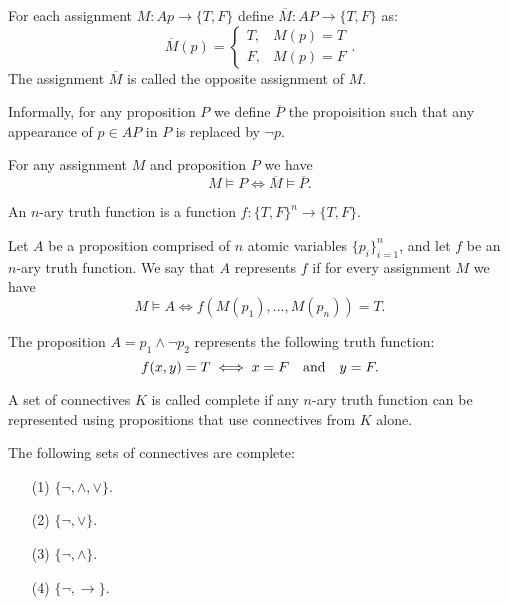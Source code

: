 \documentclass[11pt,a4paper]{article}
\renewcommand{\implies}{\rightarrow}
\begin{document}
  \begin{definition}
    For each assignment $M \colon Ap \to \{T, F\}$ 
    define $\overline M \colon AP \to \{T, F\}$ as:
    \[
      \overline M(p) =
      \begin{cases}
        T, &M(p) = T \\
        F, &M(p) = F
      \end{cases}.
    \]
    The assignment $\overline M$ is called the opposite assignment
    of $M$.
  \end{definition}
  
  Informally, for any proposition $P$ we define $\overline P$ the
  propoisition such that any appearance of $p \in AP$ in $P$ is
  replaced by $\neg p$.

  \begin{proposition}
    For any assignment $M$ and proposition $P$ we have
    \[
      M \models P \iff \overline M \models \overline P.
    \]
  \end{proposition}

  \begin{definition}
    An $n$-ary truth function is a function
    $f \colon \{T, F\}^n \to \{T, F\}$.
  \end{definition}

  \begin{definition}
    Let $A$ be a proposition comprised of $n$ atomic variables
    $\{p_i\}_{i=1}^{n}$, and let $f$ be an $n$-ary truth function.
    We say that $A$ represents $f$ if for every assignment
    $M$ we have
    \[
      M \models A \iff
      f(M(p_1),\dots,M(p_n)) = T.
    \]
  \end{definition}

  \begin{example}
    The proposition $A = p_1 \land \neg p_2$ represents the following
    truth function:
    \[
      f(x,y) = T \iff x = F \quad \text{and} \quad y = F.
    \]
  \end{example}

  \begin{definition}
    A set of connectives $K$ is called complete if any $n$-ary truth
    function can be represented using propositions that use connectives from 
    $K$ alone.
  \end{definition}

  \begin{proposition}
    The following sets of connectives are complete:
    \begin{enumerate}
      \item[(1)] $\{\neg, \land, \lor\}$.
      \item[(2)] $\{\neg, \lor\}$.
      \item[(3)] $\{\neg, \land\}$.
      \item[(4)] $\{\neg, \implies\}$.
    \end{enumerate}
  \end{proposition}
\end{document}
